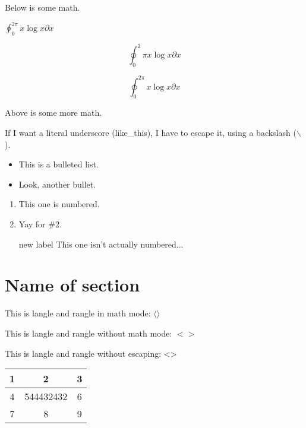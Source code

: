 \documentclass[letterpaper,10pt,titlepage]{article}
\begin{document}
Below is some math.

$
\oint_0^{2\pi} x \log x \partial x
$

$$
\oint_0^2\pi x \log x \partial x
$$

\begin{equation}
\oint_0^{2\pi} x \log x \partial x
\end{equation}

Above is some more math.

If I want a literal underscore (like\_this), I have to escape it, using a backslash ($\backslash$).


\begin{itemize}
\item This is a bulleted list.
\item Look, another bullet.
\end{itemize}

\begin{enumerate}
\item This one is numbered.
\item Yay for \#2.
\item[new label] This one isn't actually numbered...
\end{enumerate}

\section*{Name of section}

This is langle and rangle in math mode: $\langle \rangle$

This is langle and rangle without math mode: $<>$

This is langle and rangle without escaping: <>

\begin{tabular}{|c|c|c|}
  \hline
  1 & 2 & 3 \\ \hline
  4 & 544432432 & 6 \\ \hline
  7 & 8 & 9 \\ \hline 
\end{tabular}



%
\end{document}
